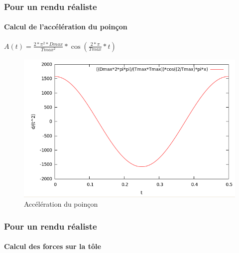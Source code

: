 \documentclass{beamer}
\begin{document}
\begin{frame}
    \frametitle{Pour un rendu réaliste}
    \framesubtitle{Calcul de l'accélération du poinçon}
    \begin{center}
        $A(t) = \frac{2*\pi^2*Dmax}{Tmax^2}*\cos(\frac{2*\pi}{Tmax}*t)$
    \end{center}
    \begin{figure}
        \includegraphics[width=.7\textwidth]{img/acceleration.png}
        \caption{Accélération du poinçon}
        \label{Accélération}
    \end{figure}
\end{frame}
\begin{frame}
    \frametitle{Pour un rendu réaliste}
    \framesubtitle{Calcul des forces sur la tôle}
\end{frame}
\end{document}
